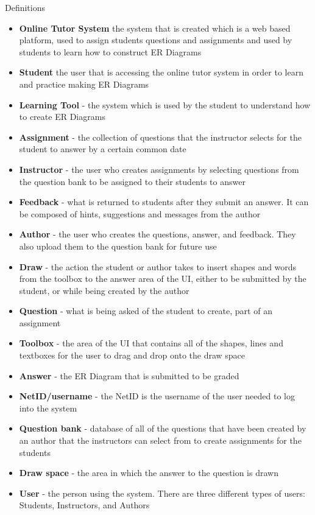 	\begin{chapter}{Definitions}
 		\begin{itemize}
 			\item{\textbf{Online Tutor System}  the system that is created which is a web based platform, 
 			used to assign students questions and assignments and used by students to learn how to 
 			construct ER Diagrams}
			\item{\textbf{Student}  the user that is accessing the online tutor system in order to learn 
			and practice making ER Diagrams}
			\item{\textbf{Learning Tool} - the system which is used by the student to understand how to 
			create ER Diagrams}
			\item{\textbf{Assignment} - the collection of questions that the instructor selects for the 
			student to answer by a certain common date}
			\item{\textbf{Instructor} - the user who creates assignments by selecting questions from the 
			question bank to be assigned to their students to answer}
			\item{\textbf{Feedback} - what is returned to students after they submit an answer.  It can be 
			composed of hints, suggestions and messages from the author}
			\item{\textbf{Author} - the user who creates the questions, answer, and feedback.  They also 
			upload them to the question bank for future use}
			\item{\textbf{Draw} - the action the student or author takes to insert shapes and words from 
			the toolbox to the answer area of the UI, either to be submitted by the student, or while 
			being created by the author}
			\item{\textbf{Question} - what is being asked of the student to create, part of an assignment}
			\item{\textbf{Toolbox} - the area of the UI that contains all of the shapes, lines and textboxes 
			for the user to drag and drop onto the draw space}
			\item{\textbf{Answer} - the ER Diagram that is submitted to be graded}
			\item{\textbf{NetID/username} - the NetID is the username of the user needed to log into the 
			system}
			\item{\textbf{Question bank} - database of all of the questions that have been created by an 
			author that the instructors can select from to create assignments for the students}
			\item{\textbf{Draw space} - the area in which the answer to the question is drawn}
			\item{\textbf{User} - the person using the system. There are three different types of users: 
			Students, Instructors, and Authors}
		\end{itemize}
	\end{chapter}
